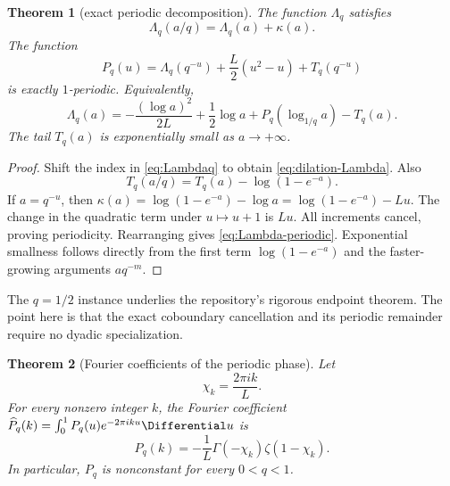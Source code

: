 \documentclass[11pt]{article}
\newtheorem{theorem}{Theorem}[section]
\theoremstyle{definition}
\theoremstyle{remark}
\begin{document}
\begin{theorem}[exact periodic decomposition]\label{thm:periodic-decomposition}
The function $\Lambda_q$ satisfies
\begin{equation}\label{eq:dilation-Lambda}
 \Lambda_q(a/q)=\Lambda_q(a)+\kappa(a).
\end{equation}
The function
\begin{equation}\label{eq:Pq-def}
 P_q(u)=\Lambda_q(q^{-u})+\frac L2(u^2-u)+T_q(q^{-u})
\end{equation}
is exactly $1$-periodic.  Equivalently,
\begin{equation}\label{eq:Lambda-periodic}
 \boxed{\quad
 \Lambda_q(a)=
 -\frac{(\log a)^2}{2L}+\frac12\log a
 +P_q\!\left(\log_{1/q}a\right)-T_q(a).
 \quad}
\end{equation}
The tail $T_q(a)$ is exponentially small as $a\to+\infty$.
\end{theorem}

\begin{proof}
Shift the index in \cref{eq:Lambdaq} to obtain \cref{eq:dilation-Lambda}.  Also
\[
 T_q(a/q)=T_q(a)-\log(1-e^{-a}).
\]
If $a=q^{-u}$, then $\kappa(a)=\log(1-e^{-a})-\log a=\log(1-e^{-a})-Lu$.  The change in the quadratic term under $u\mapsto u+1$ is $Lu$.  All increments cancel, proving periodicity.  Rearranging gives \cref{eq:Lambda-periodic}.  Exponential smallness follows directly from the first term $\log(1-e^{-a})$ and the faster-growing arguments $aq^{-m}$.
\end{proof}

The $q=1/2$ instance underlies the repository's rigorous endpoint theorem.  The point here is that the exact coboundary cancellation and its periodic remainder require no dyadic specialization.

\begin{theorem}[Fourier coefficients of the periodic phase]\label{thm:periodic-fourier}
Let
\[
 \chi_k=\frac{2\pi i k}{L}.
\]
For every nonzero integer $k$, the Fourier coefficient
$\widehat P_q(k)=\int_0^1P_q(u)e^{-2\pi iku}\Differential u$ is
\begin{equation}\label{eq:Pq-fourier}
 \boxed{\quad
 \widehat P_q(k)=-\frac1L\Gamma(-\chi_k)\zeta(1-\chi_k).
 \quad}
\end{equation}
In particular, $P_q$ is nonconstant for every $0<q<1$.
\end{theorem}
\end{document}
